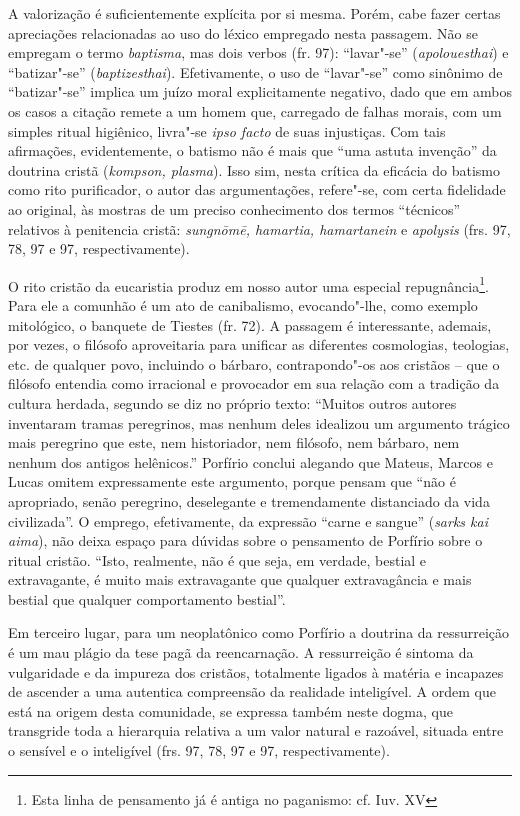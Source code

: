 A valorização é suficientemente explícita por si mesma. Porém, cabe
fazer certas apreciações relacionadas ao uso do léxico empregado nesta
passagem. Não se empregam o termo
\textit{baptisma}, mas
dois verbos (fr. 97):
“lavar"-se” (\textit{apolouesthai})
e
“batizar"-se” (\textit{baptizesthai}).
Efetivamente, o uso de “lavar"-se” como sinônimo de “batizar"-se” implica
um juízo moral explicitamente negativo, dado que em ambos os casos a
citação remete a um homem que, carregado de falhas morais, com um
simples ritual higiênico, livra"-se \textit{ipso facto} de suas
injustiças. Com tais afirmações, evidentemente, o batismo não é mais
que “uma astuta invenção” da doutrina cristã
(\textit{kompson, plasma}). Isso sim, nesta
crítica da eficácia do batismo como rito purificador, o autor das
argumentações, refere"-se, com certa fidelidade ao original, às mostras
de um preciso conhecimento dos termos “técnicos” relativos à penitencia
cristã:
\textit{sungnōmē, hamartia, hamartanein} e \textit{apolysis} (frs.
97, 78, 97 e 97, respectivamente).

O rito cristão da eucaristia produz em nosso autor uma especial
repugnância\footnote{ Esta linha de pensamento já é antiga no
paganismo: cf. Iuv. XV}. Para ele a comunhão é um ato de canibalismo,
evocando"-lhe, como exemplo mitológico, o banquete de Tiestes (fr. 72).
A passagem é interessante, ademais, por vezes, o filósofo aproveitaria
para unificar as diferentes cosmologias, teologias, etc. de qualquer
povo, incluindo o bárbaro, contrapondo"-os aos cristãos – que o filósofo
entendia como irracional e provocador em sua relação com a tradição da
cultura herdada, segundo se diz no próprio texto: “Muitos outros
autores inventaram tramas peregrinos, mas nenhum deles idealizou um
argumento trágico mais peregrino que este, nem historiador, nem
filósofo, nem bárbaro, nem nenhum dos antigos helênicos.” Porfírio
conclui alegando que Mateus, Marcos e Lucas omitem expressamente este
argumento, porque pensam que “não é apropriado, senão peregrino,
deselegante e tremendamente distanciado da vida civilizada”.
O emprego, efetivamente, da expressão
“carne e sangue” (\textit{sarks kai aima}), não deixa espaço para dúvidas sobre o pensamento de
Porfírio sobre o ritual cristão. “Isto, realmente, não é que seja, em
verdade, bestial e extravagante, é muito mais extravagante que qualquer
extravagância e mais bestial que qualquer comportamento bestial”.

Em terceiro lugar, para um neoplatônico como Porfírio a doutrina da
ressurreição é um mau plágio da tese pagã da reencarnação. A
ressurreição é sintoma da vulgaridade e da impureza dos cristãos,
totalmente ligados à matéria e incapazes de ascender a uma autentica
compreensão da realidade inteligível. A ordem que está na origem desta
comunidade, se expressa também neste dogma, que transgride toda a
hierarquia relativa a um valor natural e razoável, situada entre o
sensível e o inteligível (frs. 97, 78, 97 e 97, respectivamente).

